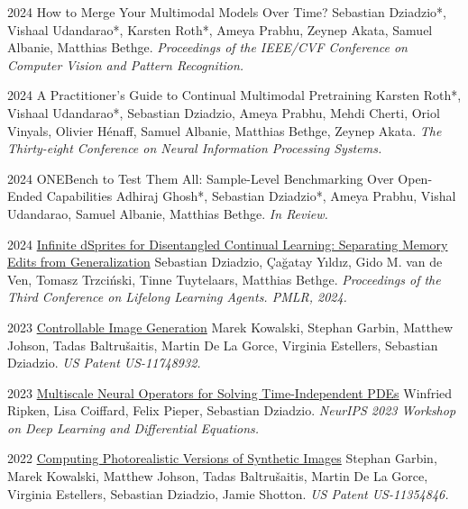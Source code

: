 \documentclass[]{friggeri-cv_osx}
\begin{document}
\begin{entrylist}
\entry
{2024}
{How to Merge Your Multimodal Models Over Time?}
{}
{Sebastian Dziadzio*, Vishaal Udandarao*, Karsten Roth*, Ameya Prabhu, Zeynep Akata, Samuel Albanie, Matthias Bethge.
\textit{Proceedings of the IEEE/CVF Conference on Computer Vision and Pattern Recognition.}\\}

\entry
{2024}
{A Practitioner's Guide to Continual Multimodal Pretraining}
{}
{Karsten Roth*, Vishaal Udandarao*, Sebastian Dziadzio, Ameya Prabhu, Mehdi Cherti, Oriol Vinyals, Olivier Hénaff, Samuel Albanie, Matthias Bethge, Zeynep Akata.
\textit{The Thirty-eight Conference on Neural Information Processing Systems.}\\}

\entry
{2024}
{ONEBench to Test Them All: Sample-Level Benchmarking Over Open-Ended Capabilities}
{}
{Adhiraj Ghosh*, Sebastian Dziadzio*, Ameya Prabhu, Vishal Udandarao, Samuel Albanie, Matthias Bethge.
\textit{In Review.}\\}

\entry
{2024}
{\href{https://scholar.google.com/citations?user=8vAIQXoAAAAJ&hl=en}{Infinite dSprites for Disentangled Continual Learning: Separating Memory Edits from Generalization}}
{}
{Sebastian Dziadzio, Çağatay Yıldız, Gido M. van de Ven, Tomasz Trzciński, Tinne Tuytelaars, Matthias Bethge.
\textit{Proceedings of the Third Conference on Lifelong Learning Agents. PMLR, 2024.}\\}

\entry
{2023}
{\href{https://scholar.google.com/citations?user=8vAIQXoAAAAJ&hl=en}{Controllable Image Generation}}
{}
{Marek Kowalski, Stephan Garbin, Matthew Johson, Tadas Baltru\v{s}aitis, Martin De La Gorce, Virginia Estellers, Sebastian Dziadzio.
\textit{US Patent US-11748932.}\\}

\entry
{2023}
{\href{https://scholar.google.com/citations?user=8vAIQXoAAAAJ&hl=en}{Multiscale Neural Operators for Solving Time-Independent PDEs}}
{}
{Winfried Ripken, Lisa Coiffard, Felix Pieper, Sebastian Dziadzio.
\textit{NeurIPS 2023 Workshop on Deep Learning and Differential Equations.}\\}

\entry
{2022}
{\href{https://scholar.google.com/citations?user=8vAIQXoAAAAJ&hl=en}{Computing Photorealistic Versions of Synthetic Images}}
{}
{Stephan Garbin, Marek Kowalski, Matthew Johson, Tadas Baltru\v{s}aitis, Martin De La Gorce, Virginia Estellers, Sebastian Dziadzio, Jamie Shotton.
\textit{US Patent US-11354846.}\\}


\end{entrylist}
\end{document}
